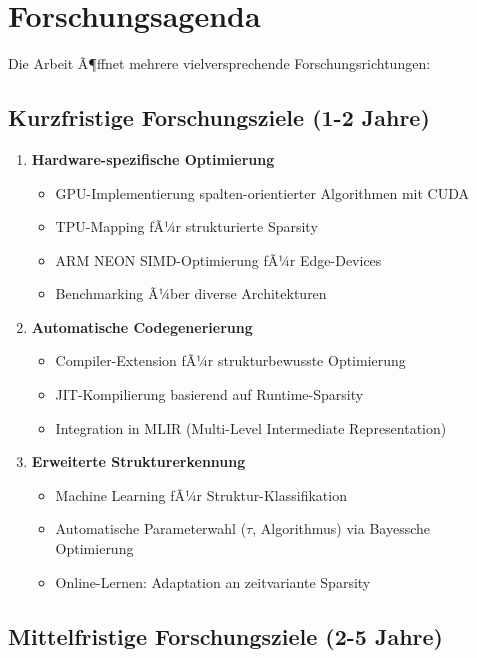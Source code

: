 ﻿\documentclass[a4paper,12pt]{report}
\theoremstyle{definition}
\begin{document}
	\section{Forschungsagenda}
	
	Die Arbeit Ã¶ffnet mehrere vielversprechende Forschungsrichtungen:
	
	\subsection{Kurzfristige Forschungsziele (1-2 Jahre)}
	
	\begin{enumerate}
		\item \textbf{Hardware-spezifische Optimierung}
		\begin{itemize}
			\item GPU-Implementierung spalten-orientierter Algorithmen mit CUDA
			\item TPU-Mapping fÃ¼r strukturierte Sparsity
			\item ARM NEON SIMD-Optimierung fÃ¼r Edge-Devices
			\item Benchmarking Ã¼ber diverse Architekturen
		\end{itemize}
		
		\item \textbf{Automatische Codegenerierung}
		\begin{itemize}
			\item Compiler-Extension fÃ¼r strukturbewusste Optimierung
			\item JIT-Kompilierung basierend auf Runtime-Sparsity
			\item Integration in MLIR (Multi-Level Intermediate Representation)
		\end{itemize}
		
		\item \textbf{Erweiterte Strukturerkennung}
		\begin{itemize}
			\item Machine Learning fÃ¼r Struktur-Klassifikation
			\item Automatische Parameterwahl ($\tau$, Algorithmus) via Bayessche Optimierung
			\item Online-Lernen: Adaptation an zeitvariante Sparsity
		\end{itemize}
	\end{enumerate}
	
	\subsection{Mittelfristige Forschungsziele (2-5 Jahre)}
	
\end{document}
